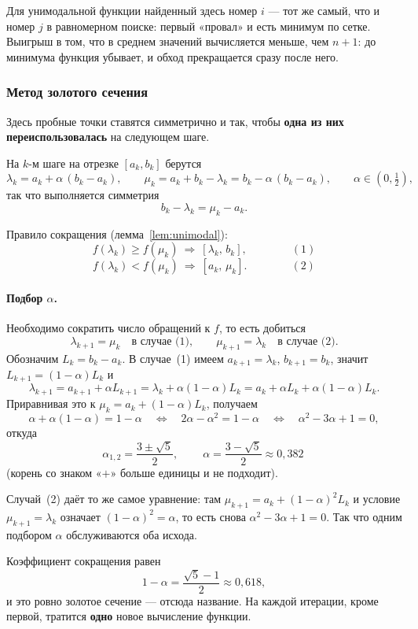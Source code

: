 \begin{idea}
Для унимодальной функции найденный здесь номер $i$ — тот же самый, что и номер
$j$ в равномерном поиске: первый «провал» и есть минимум по сетке. Выигрыш в
том, что в среднем значений вычисляется меньше, чем $n+1$: до минимума функция
убывает, и обход прекращается сразу после него.
\end{idea}

\subsubsection*{Метод золотого сечения}

Здесь пробные точки ставятся симметрично и так, чтобы \textbf{одна из них
переиспользовалась} на следующем шаге.

На $k$-м шаге на отрезке $[a_k, b_k]$ берутся
\[
  \lambda_k = a_k + \alpha\,(b_k - a_k), \qquad
  \mu_k = a_k + b_k - \lambda_k = b_k - \alpha\,(b_k - a_k),
  \qquad \alpha \in \left(0,\tfrac12\right) ,
\]
так что выполняется симметрия
\[
  b_k - \lambda_k = \mu_k - a_k .
\]


Правило сокращения (лемма~\ref{lem:unimodal}):
\[
  f(\lambda_k) \ge f(\mu_k) \ \Longrightarrow\ [\lambda_k,\, b_k] ,
  \qquad\qquad (1)
\]
\[
  f(\lambda_k) < f(\mu_k) \ \Longrightarrow\ [a_k,\, \mu_k] .
  \qquad\qquad (2)
\]

\paragraph{Подбор $\alpha$.} Необходимо сократить число обращений к $f$, то
есть добиться
\[
  \lambda_{k+1} = \mu_k \quad\text{в случае (1)},
  \qquad
  \mu_{k+1} = \lambda_k \quad\text{в случае (2)} .
\]
Обозначим $L_k = b_k - a_k$. В случае~(1) имеем $a_{k+1} = \lambda_k$,
$b_{k+1} = b_k$, значит $L_{k+1} = (1-\alpha)L_k$ и
\[
  \lambda_{k+1} = a_{k+1} + \alpha L_{k+1}
  = \lambda_k + \alpha(1-\alpha)L_k
  = a_k + \alpha L_k + \alpha(1-\alpha)L_k .
\]
Приравнивая это к $\mu_k = a_k + (1-\alpha)L_k$, получаем
\[
  \alpha + \alpha(1-\alpha) = 1 - \alpha
  \quad\Longleftrightarrow\quad
  2\alpha - \alpha^2 = 1 - \alpha
  \quad\Longleftrightarrow\quad
  \alpha^2 - 3\alpha + 1 = 0 ,
\]
откуда
\[
  \alpha_{1,2} = \frac{3 \pm \sqrt5}{2},
  \qquad
  \boxed{\ \alpha = \frac{3 - \sqrt5}{2} \approx 0{,}382\ }
\]
(корень со знаком «$+$» больше единицы и не подходит).

\begin{idea}
Случай~(2) даёт то же самое уравнение: там $\mu_{k+1} = a_k + (1-\alpha)^2 L_k$
и условие $\mu_{k+1} = \lambda_k$ означает $(1-\alpha)^2 = \alpha$, то есть
снова $\alpha^2 - 3\alpha + 1 = 0$. Так что одним подбором $\alpha$
обслуживаются оба исхода.

\medskip
Коэффициент сокращения равен
\[
  1 - \alpha = \frac{\sqrt5 - 1}{2} \approx 0{,}618 ,
\]
и это ровно золотое сечение — отсюда название. На каждой итерации, кроме
первой, тратится \textbf{одно} новое вычисление функции.
\end{idea}

